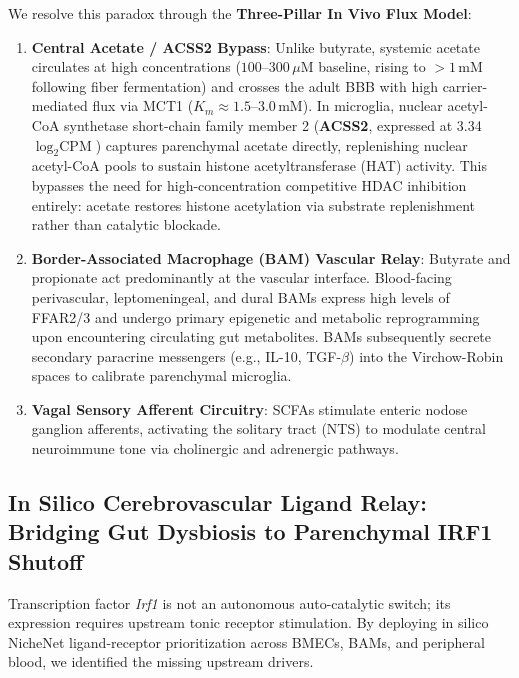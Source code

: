 \documentclass[10pt,a4paper]{article}
\begin{document}
We resolve this paradox through the \textbf{Three-Pillar In Vivo Flux Model}:
\begin{enumerate}
\item \textbf{Central Acetate / ACSS2 Bypass}: Unlike butyrate, systemic acetate circulates at high concentrations ($100\text{--}300\,\mu\text{M}$ baseline, rising to $>1\,\text{mM}$ following fiber fermentation) and crosses the adult BBB with high carrier-mediated flux via MCT1 ($K_m \approx 1.5\text{--}3.0\,\text{mM}$)\cite{frost2014_44}. In microglia, nuclear acetyl-CoA synthetase short-chain family member 2 (\textbf{ACSS2}, expressed at 3.34 $\log_2\text{CPM}$) captures parenchymal acetate directly, replenishing nuclear acetyl-CoA pools to sustain histone acetyltransferase (HAT) activity\cite{mews2019_45}. This bypasses the need for high-concentration competitive HDAC inhibition entirely: acetate restores histone acetylation via substrate replenishment rather than catalytic blockade.
\item \textbf{Border-Associated Macrophage (BAM) Vascular Relay}: Butyrate and propionate act predominantly at the vascular interface. Blood-facing perivascular, leptomeningeal, and dural BAMs express high levels of FFAR2/3 and undergo primary epigenetic and metabolic reprogramming upon encountering circulating gut metabolites\cite{mrdjen2018_46}. BAMs subsequently secrete secondary paracrine messengers (e.g., IL-10, TGF-$\beta$) into the Virchow-Robin spaces to calibrate parenchymal microglia.
\item \textbf{Vagal Sensory Afferent Circuitry}: SCFAs stimulate enteric nodose ganglion afferents, activating the solitary tract (NTS) to modulate central neuroimmune tone via cholinergic and adrenergic pathways\cite{spichak2021_30}.
\end{enumerate}
\subsection{In Silico Cerebrovascular Ligand Relay: Bridging Gut Dysbiosis to Parenchymal IRF1 Shutoff}
Transcription factor \textit{Irf1} is not an autonomous auto-catalytic switch; its expression requires upstream tonic receptor stimulation. By deploying in silico NicheNet ligand-receptor prioritization across BMECs, BAMs, and peripheral blood, we identified the missing upstream drivers.
\end{document}
